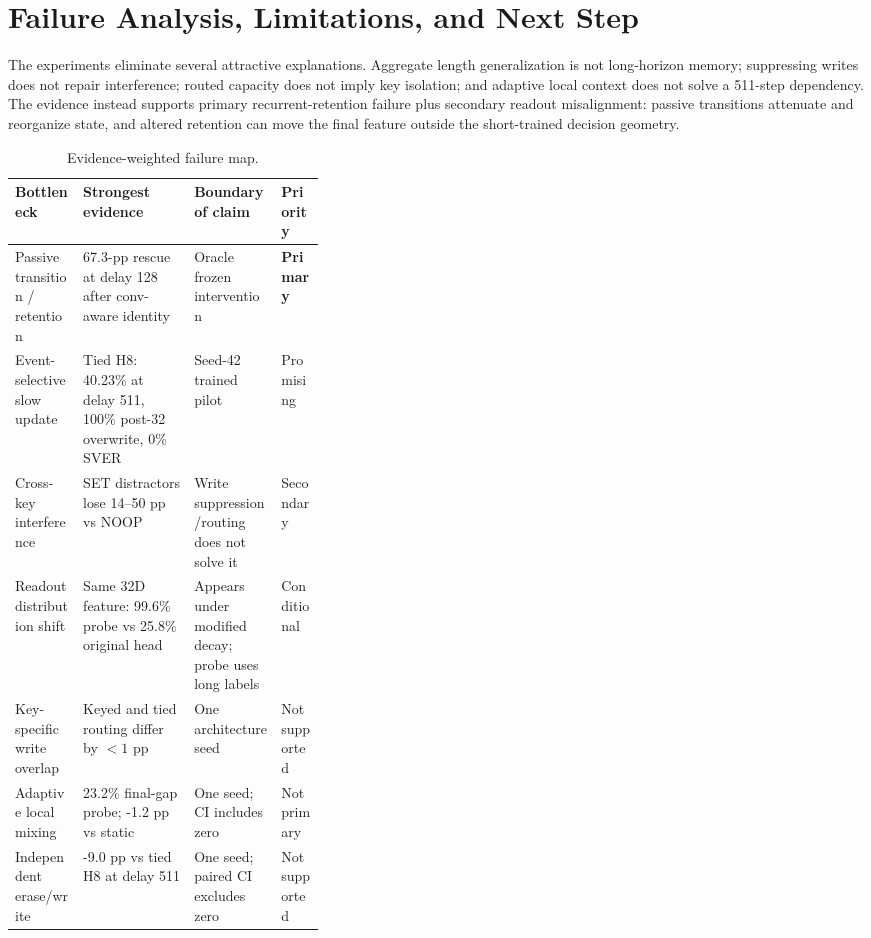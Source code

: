 \documentclass[10pt,a4paper]{article}
\begin{document}
\section{Failure Analysis, Limitations, and Next Step}
The experiments eliminate several attractive explanations. Aggregate length generalization is not long-horizon memory; suppressing writes does not repair interference; routed capacity does not imply key isolation; and adaptive local context does not solve a 511-step dependency. The evidence instead supports primary recurrent-retention failure plus secondary readout misalignment: passive transitions attenuate and reorganize state, and altered retention can move the final feature outside the short-trained decision geometry.
\begin{table}[!htbp]
\centering\small
\caption{Evidence-weighted failure map.}
\begin{tabularx}{\linewidth}{p{0.22\linewidth}Y Y p{0.14\linewidth}}
\toprule
Bottleneck & Strongest evidence & Boundary of claim & Priority \\
\midrule
Passive transition / retention & 67.3-pp rescue at delay 128 after conv-aware identity & Oracle frozen intervention & \textbf{Primary} \\
Event-selective slow update & Tied H8: 40.23\% at delay 511, 100\% post-32 overwrite, 0\% SVER & Seed-42 trained pilot & Promising \\
Cross-key interference & SET distractors lose 14--50 pp vs NOOP & Write suppression/routing does not solve it & Secondary \\
Readout distribution shift & Same 32D feature: 99.6\% probe vs 25.8\% original head & Appears under modified decay; probe uses long labels & Conditional \\
Key-specific write overlap & Keyed and tied routing differ by $<1$ pp & One architecture seed & Not supported \\
Adaptive local mixing & 23.2\% final-gap probe; -1.2 pp vs static & One seed; CI includes zero & Not primary \\
Independent erase/write & -9.0 pp vs tied H8 at delay 511 & One seed; paired CI excludes zero & Not supported \\
\bottomrule
\end{tabularx}
\end{table}
\end{document}

